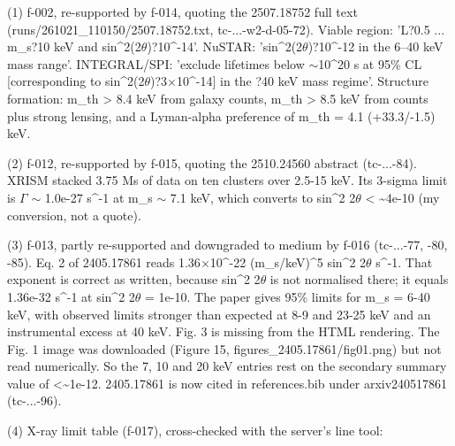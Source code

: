 \documentclass[11pt,a4paper]{article}
\begin{document}
(1) f-002, re-supported by f-014, quoting the 2507.18752 full text (runs/261021\_110150/2507.18752.txt, tc-...-w2-d-05-72). Viable region: 'L?0.5 ... m\_s?10 keV and sin\textasciicircum{}2(2$\theta$)?10\textasciicircum{}-14'. NuSTAR: 'sin\textasciicircum{}2(2$\theta$)?10\textasciicircum{}-12 in the 6--40 keV mass range'. INTEGRAL/SPI: 'exclude lifetimes below $\sim$10\textasciicircum{}20 s at 95\% CL [corresponding to sin\textasciicircum{}2(2$\theta$)?3$\times$10\textasciicircum{}-14] in the ?40 keV mass regime'. Structure formation: m\_th \textgreater{} 8.4 keV from galaxy counts, m\_th \textgreater{} 8.5 keV from counts plus strong lensing, and a Lyman-alpha preference of m\_th = 4.1 (+33.3/-1.5) keV.

(2) f-012, re-supported by f-015, quoting the 2510.24560 abstract (tc-...-84). XRISM stacked 3.75 Ms of data on ten clusters over 2.5-15 keV. Its 3-sigma limit is $\Gamma$ $\sim$ 1.0e-27 s\textasciicircum{}-1 at m\_s $\sim$ 7.1 keV, which converts to sin\textasciicircum{}2 2$\theta$ \textless{} \textasciitilde{}4e-10 (my conversion, not a quote).

(3) f-013, partly re-supported and downgraded to medium by f-016 (tc-...-77, -80, -85). Eq. 2 of 2405.17861 reads 1.36$\times$10\textasciicircum{}-22 (m\_s/keV)\textasciicircum{}5 sin\textasciicircum{}2 2$\theta$ s\textasciicircum{}-1. That exponent is correct as written, because sin\textasciicircum{}2 2$\theta$ is not normalised there; it equals 1.36e-32 s\textasciicircum{}-1 at sin\textasciicircum{}2 2$\theta$ = 1e-10. The paper gives 95\% limits for m\_s = 6-40 keV, with observed limits stronger than expected at 8-9 and 23-25 keV and an instrumental excess at 40 keV. Fig. 3 is missing from the HTML rendering. The Fig. 1 image was downloaded (Figure 15, figures\_2405.17861/fig01.png) but not read numerically. So the 7, 10 and 20 keV entries rest on the secondary summary value of \textless{}\textasciitilde{}1e-12. 2405.17861 is now cited in references.bib under arxiv240517861 (tc-...-96).

(4) X-ray limit table (f-017), cross-checked with the server's line tool:
\end{document}

